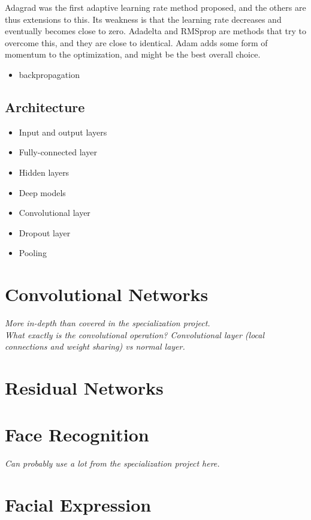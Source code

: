 \noindent Adagrad was the first adaptive learning rate method proposed, and the others are thus extensions to this. Its weakness is that the learning rate decreases and eventually becomes close to zero. Adadelta and RMSprop are methods that try to overcome this, and they are close to identical. Adam adds some form of momentum to the optimization, and might be the best overall choice.


\begin{itemize}
    \item backpropagation
\end{itemize}

\subsection{Architecture}

\begin{itemize}
    \item Input and output layers
    \item Fully-connected layer
    \item Hidden layers
    \item Deep models
    \item Convolutional layer
    \item Dropout layer
    \item Pooling
\end{itemize}

\section{Convolutional Networks}

\textit{More in-depth than covered in the specialization project. \\
What exactly is the convolutional operation? Convolutional layer (local connections and weight sharing) vs normal layer.}

\section{Residual Networks}

\section{Face Recognition}

\textit{Can probably use a lot from the specialization project here.}

\section{Facial Expression}

